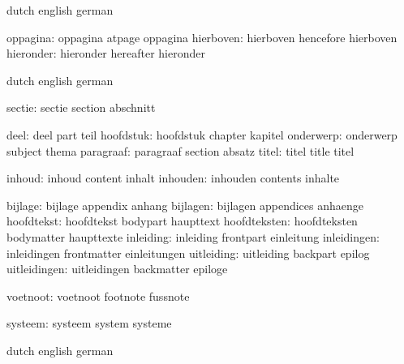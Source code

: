 \stopvariables


\startvariables  dutch       english     german

      oppagina:  oppagina    atpage      oppagina   %
     hierboven:  hierboven   hencefore   hierboven  %
     hieronder:  hieronder   hereafter   hieronder  %

\stopvariables




\startvariables       dutch                english             german

             sectie:  sectie               section             abschnitt

               deel:  deel                 part                teil
          hoofdstuk:  hoofdstuk            chapter             kapitel
          onderwerp:  onderwerp            subject             thema
          paragraaf:  paragraaf            section             absatz
              titel:  titel                title               titel

             inhoud:  inhoud               content             inhalt
           inhouden:  inhouden             contents            inhalte

            bijlage:  bijlage              appendix            anhang
           bijlagen:  bijlagen             appendices          anhaenge
         hoofdtekst:  hoofdtekst           bodypart            haupttext
       hoofdteksten:  hoofdteksten         bodymatter          haupttexte
          inleiding:  inleiding            frontpart           einleitung
        inleidingen:  inleidingen          frontmatter         einleitungen
         uitleiding:  uitleiding           backpart            epilog
       uitleidingen:  uitleidingen         backmatter          epiloge

           voetnoot:  voetnoot             footnote            fussnote

            systeem:  systeem              system              systeme

\stopvariables

\startvariables       dutch                english             german

